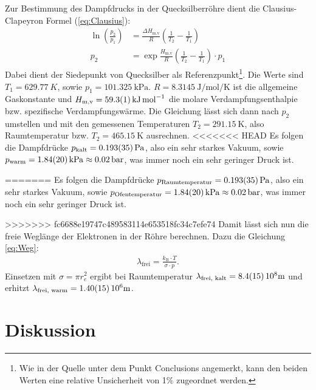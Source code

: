 	Zur Bestimmung des Dampfdrucks in der Quecksilberröhre dient die Clausius-Clapeyron Formel (\ref{eq:Clausius}):
	\begin{align} \label{eq:Clausius}
		\ln(\frac{p_2}{p_1}) &= \frac{\Delta H_\text{m,v}}{R}\left( \frac{1}{T_2} - \frac{1}{T_1} \right) \\
		p_2 &= \exp{\frac{H_\text{m,v}}{R} \left( \frac{1}{T_2} - \frac{1}{T_1} \right) } \cdot p_1
	\end{align}
	Dabei dient der Siedepunkt von Quecksilber als Referenzpunkt\cite{boilingPoint}\footnote{Wie in der Quelle unter dem Punkt Conclusions angemerkt, kann den beiden Werten eine relative Unsicherheit von 1\% zugeordnet werden.}.
	Die Werte sind $T_1 = \SI{629.77}{K}$, sowie $p_1 = \SI{101.325}{\kilo\pascal}$.
	$R = \SI{8.3145}{\joule\per\mol\per\kelvin}$ ist die allgemeine Gaskonstante\cite{Constants} und $H_\text{m,v} = \SI{59.3+-0.1}{\kilo\joule\per\mol}$ die molare Verdampfungsenthalpie bzw. spezifische Verdampfungswärme\cite{verdampfungswaerme}.
	Die Gleichung lässt sich dann nach $p_2$ umstellen und mit den gemessenen Temperaturen $T_2 = \SI{291.15}{\kelvin}$, also Raumtemperatur bzw. $T_2 = \SI{465.15}{\kelvin}$ ausrechnen.
<<<<<<< HEAD
	Es folgen die Dampfdrücke $p_\text{kalt} = \SI{0.193+-0.035}{\pascal}$, also ein sehr starkes Vakuum, sowie $p_\text{warm} = \SI{1.84+-0.20}{\kilo\pascal}\approx \SI{0.02}{\bar}$, was immer noch ein sehr geringer Druck ist.
	
=======
	Es folgen die Dampfdrücke $p_\text{Raumtemperatur} = \SI{0.193+-0.035}{\pascal}$, also ein sehr starkes Vakuum, sowie $p_\text{Ofentemperatur} = \SI{1.84+-0.20}{\kilo\pascal}\approx \SI{0.02}{\bar}$, was immer noch ein sehr geringer Druck ist.

>>>>>>> fc6688e19747c489583114e653518fc34c7efe74
	Damit lässt sich nun die freie Weglänge der Elektronen in der Röhre berechnen.
	Dazu die Gleichung \ref{eq:Weg}:
	\begin{align} \label{eq:Weg}
		\lambda_\text{frei} = \frac{k_\text{B}\cdot T}{\sigma\cdot p}.
	\end{align}
 	Einsetzen mit $\sigma = \pi r_e^2$\cite{Constants} ergibt bei Raumtemperatur $\lambda_\text{frei, kalt} = \SI{8.4+-1.5}{10^8\meter}$ und erhitzt $\lambda_\text{frei, warm} = \SI{1.40+-0.15}{10^6\meter}$. 

\section{Diskussion}
	
